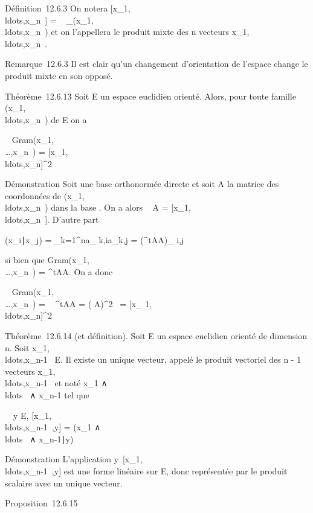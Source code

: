 \documentclass[]{article}
\begin{document}
Définition~12.6.3 On notera
[x_1,\\ldots,x_n~]
= ~
_(x_1,\\ldots,x_n~)
et on l'appellera le produit mixte des n vecteurs
x_1,\\ldots,x_n~.

Remarque~12.6.3 Il est clair qu'un changement d'orientation de l'espace
change le produit mixte en son opposé.

Théorème~12.6.13 Soit E un espace euclidien orienté. Alors, pour toute
famille
(x_1,\\ldots,x_n~)
de E on a

~
Gram(x_1,\\\ldots,x_n~)
=
[x_1,\\ldots,x_n]^2~

Démonstration Soit  une base orthonormée directe et soit A la matrice
des coordonnées de
(x_1,\\ldots,x_n~)
dans la base . On a alors
~ A =
[x_1,\\ldots,x_n~].
D'autre part

(x_i∣x_j) =
\sum _k=1^na_
k,ia_k,j = (^tAA)_ i,j

si bien que
Gram(x_1,\\\ldots,x_n~)
= ^tAA. On a donc

~
Gram(x_1,\\\ldots,x_n~)
= ~
^tAA =
( A)^2~
= [x_
1,\\ldots,x_n]^2~

Théorème~12.6.14 (et définition). Soit E un espace euclidien orienté de
dimension n. Soit
x_1,\\ldots,x_n-1~
\in E. Il existe un unique vecteur, appelé le produit vectoriel des n - 1
vecteurs
x_1,\\ldots,x_n-1~
et noté x_1
∧\\ldots~ ∧
x_n-1 tel que

\forall~~y \in E,
[x_1,\\ldots,x_n-1~,y]
= (x_1
∧\\ldots~ ∧
x_n-1∣y)

Démonstration L'application
y\mapsto~[x_1,\\ldots,x_n-1~,y]
est une forme linéaire sur E, donc représentée par le produit scalaire
avec un unique vecteur.

Proposition~12.6.15
\end{document}
